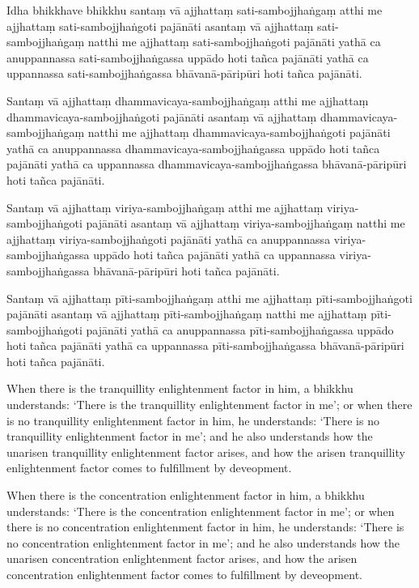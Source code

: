 \paliPage

Idha bhikkhave bhikkhu santaṃ vā ajjhattaṃ sati-sambojjhaṅgaṃ atthi me ajjhattaṃ
sati-sambojjhaṅgoti pajānāti asantaṃ vā ajjhattaṃ sati-sambojjhaṅgaṃ natthi me
ajjhattaṃ sati-sambojjhaṅgoti pajānāti yathā ca anuppannassa sati-sambojjhaṅgassa
uppādo hoti tañca pajānāti yathā ca uppannassa sati-sambojjhaṅgassa
bhāvanā-pāripūri hoti tañca pajānāti.

Santaṃ vā ajjhattaṃ dhammavicaya-sambojjhaṅgaṃ atthi me ajjhattaṃ
dhammavicaya-sambojjhaṅgoti pajānāti asantaṃ vā ajjhattaṃ
dhammavicaya-sambojjhaṅgaṃ natthi me ajjhattaṃ dhammavicaya-sambojjhaṅgoti
pajānāti yathā ca anuppannassa dhammavicaya-sambojjhaṅgassa uppādo hoti tañca
pajānāti yathā ca uppannassa dhammavicaya-sambojjhaṅgassa bhāvanā-pāripūri hoti
tañca pajānāti.

Santaṃ vā ajjhattaṃ viriya-sambojjhaṅgaṃ atthi me ajjhattaṃ viriya-sambojjhaṅgoti
pajānāti asantaṃ vā ajjhattaṃ viriya-sambojjhaṅgaṃ natthi me ajjhattaṃ
viriya-sambojjhaṅgoti pajānāti yathā ca anuppannassa viriya-sambojjhaṅgassa uppādo
hoti tañca pajānāti yathā ca uppannassa viriya-sambojjhaṅgassa bhāvanā-pāripūri
hoti tañca pajānāti.

Santaṃ vā ajjhattaṃ pīti-sambojjhaṅgaṃ atthi me ajjhattaṃ pīti-sambojjhaṅgoti
pajānāti asantaṃ vā ajjhattaṃ pīti-sambojjhaṅgaṃ natthi me ajjhattaṃ
pīti-sambojjhaṅgoti pajānāti yathā ca anuppannassa pīti-sambojjhaṅgassa uppādo
hoti tañca pajānāti yathā ca uppannassa pīti-sambojjhaṅgassa bhāvanā-pāripūri hoti
tañca pajānāti.

\englishPage

When there is the tranquillity enlightenment factor in him, a bhikkhu
understands: `There is the tranquillity enlightenment factor in me'; or when
there is no tranquillity enlightenment factor in him, he understands: `There is
no tranquillity enlightenment factor in me'; and he also understands how the
unarisen tranquillity enlightenment factor arises, and how the arisen
tranquillity enlightenment factor comes to fulfillment by deveopment.

When there is the concentration enlightenment factor in him, a bhikkhu
understands: `There is the concentration enlightenment factor in me'; or when
there is no concentration enlightenment factor in him, he understands: `There is
no concentration enlightenment factor in me'; and he also understands how the
unarisen concentration enlightenment factor arises, and how the arisen
concentration enlightenment factor comes to fulfillment by deveopment.

